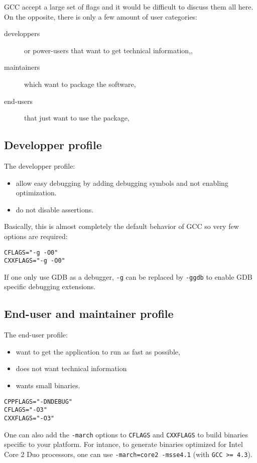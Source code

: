 GCC accept a large set of flags and it would be difficult to discuss them all here. On the opposite, there is only a few amount of user categories:
\begin{description}
\item[developpers] or power-users that want to get technical information,,
\item[maintainers] which want to package the software,
\item[end-users] that just want to use the package,
\end{description}

\subsection{Developper profile}

The developper profile:
\begin{itemize}
\item allow easy debugging by adding debugging symbols and not enabling optimization.
\item do not disable assertions.
\end{itemize}

Basically, this is almost completely the default behavior of GCC so very few options are required:
\begin{verbatim}
CFLAGS="-g -O0"
CXXFLAGS="-g -O0"
\end{verbatim}

If one only use GDB as a debugger, \texttt{-g} can be replaced by
\texttt{-ggdb} to enable GDB specific debugging extensions.

\subsection{End-user and maintainer profile}

The end-user profile:
\begin{itemize}
\item want to get the application to run as fast as possible,
\item does not want technical information
\item wants small binaries.
\end{itemize}

\begin{verbatim}
CPPFLAGS="-DNDEBUG"
CFLAGS="-O3"
CXXFLAGS="-O3"
\end{verbatim}

One can also add the \texttt{-march} options to \texttt{CFLAGS} and
\texttt{CXXFLAGS} to build binaries specific to your platform.  For
intance, to generate binaries optimized for Intel Core 2 Duo
processors, one can use \texttt{-march=core2 -msse4.1} (with
\texttt{GCC >= 4.3}).

